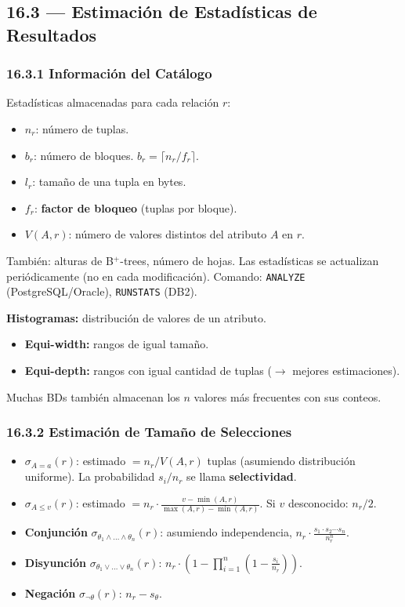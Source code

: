 \documentclass[11pt, a4paper]{article}
\begin{document}
\subsection{16.3 --- Estimación de Estadísticas de Resultados}

\subsubsection{16.3.1 Información del Catálogo}

Estadísticas almacenadas para cada relación $r$:
\begin{itemize}[nosep]
	\item $n_r$: número de tuplas.
	\item $b_r$: número de bloques. $b_r = \lceil n_r / f_r \rceil$.
	\item $l_r$: tamaño de una tupla en bytes.
	\item $f_r$: \textbf{factor de bloqueo} (tuplas por bloque).
	\item $V(A, r)$: número de valores distintos del atributo $A$ en $r$.
\end{itemize}

También: alturas de B$^+$-trees, número de hojas. Las estadísticas se actualizan periódicamente (no en cada modificación). Comando: \texttt{ANALYZE} (PostgreSQL/Oracle), \texttt{RUNSTATS} (DB2).

\textbf{Histogramas:} distribución de valores de un atributo.
\begin{itemize}[nosep]
	\item \textbf{Equi-width:} rangos de igual tamaño.
	\item \textbf{Equi-depth:} rangos con igual cantidad de tuplas ($\rightarrow$ mejores estimaciones).
\end{itemize}
Muchas BDs también almacenan los $n$ valores más frecuentes con sus conteos.

\subsubsection{16.3.2 Estimación de Tamaño de Selecciones}

\begin{itemize}[nosep]
	\item $\sigma_{A=a}(r)$: estimado $= n_r / V(A, r)$ tuplas (asumiendo distribución uniforme). La probabilidad $s_i / n_r$ se llama \textbf{selectividad}.
	\item $\sigma_{A \leq v}(r)$: estimado $= n_r \cdot \frac{v - \min(A,r)}{\max(A,r) - \min(A,r)}$. Si $v$ desconocido: $n_r / 2$.
	\item \textbf{Conjunción} $\sigma_{\theta_1 \wedge \ldots \wedge \theta_n}(r)$: asumiendo independencia, $n_r \cdot \frac{s_1 \cdot s_2 \cdots s_n}{n_r^n}$.
	\item \textbf{Disyunción} $\sigma_{\theta_1 \vee \ldots \vee \theta_n}(r)$: $n_r \cdot \left(1 - \prod_{i=1}^n \left(1 - \frac{s_i}{n_r}\right)\right)$.
	\item \textbf{Negación} $\sigma_{\neg \theta}(r)$: $n_r - s_\theta$.
\end{itemize}
\end{document}
